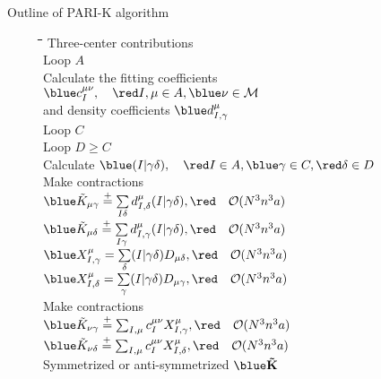 \begin{frame}{ Outline of PARI-K algorithm}
\footnotesize
\begin{figure}
\begin{tabbing}
\hspace{3pt}\=\hspace{10pt}\=\hspace{10pt}\=\hspace{10pt}\=\hspace{10pt}\=\hspace{10pt}\=\hspace{10pt}\=\hspace{10pt}\=\hspace{10pt}\=\hspace{10pt}\kill
\> {\blue Three-center contributions} \\
\> Loop $A$ \\
\> \> Calculate the fitting coefficients $\blue c_I^{\mu\nu}, \quad \red I,\mu\in A, \blue \nu\in {\cal M}$ \\
\> \> and density coefficients $\blue d_{I,\gamma}^\mu $ \\
\> \> Loop $C$ \\
\> \> \> Loop $D\ge C$ \\
\> \> \> \> Calculate $\blue (I|\gamma\delta), \quad \red I\in A,\blue\gamma\in C, \red\delta\in D$ \\
\> \> \> \> Make contractions \\
\> \> \> \> \> $\blue \tilde K_{\mu\gamma} \stackrel{+}{=} \sum\limits_{I\delta} d_{I,\delta}^\mu (I|\gamma\delta), \red \quad {\cal O}(N^3 n^3 a)$ \\
\> \> \> \> \> $\blue \tilde K_{\mu\delta} \stackrel{+}{=} \sum\limits_{I\gamma} d_{I,\gamma}^\mu (I|\gamma\delta), \red \quad {\cal O}(N^3 n^3 a)$ \\
\> \> \> \> \> $\blue X_{I,\gamma}^\mu = \sum\limits_\delta (I|\gamma\delta)D_{\mu\delta}, \red \quad {\cal O}(N^3 n^3 a)$ \\
\> \> \> \> \> $\blue X_{I,\delta}^\mu = \sum\limits_\gamma (I|\gamma\delta)D_{\mu\gamma}, \red \quad {\cal O}(N^3 n^3 a)$ \\
\> \> Make contractions \\
\> \> \> $\blue \tilde K_{\nu \gamma} \stackrel{+}{=} \sum_{I,\mu} c_{I}^{\mu\nu} X_{I,\gamma}^\mu, \red \quad {\cal O}(N^3 n^3 a)$ \\
\> \> \> $\blue \tilde K_{\nu \delta} \stackrel{+}{=} \sum_{I,\mu} c_{I}^{\mu\nu} X_{I,\delta}^\mu, \red \quad {\cal O}(N^3 n^3 a)$ \\
\> Symmetrized or anti-symmetrized $\blue \mathbf{\tilde K}$ \\
\end{tabbing}
\end{figure}
\end{frame}


